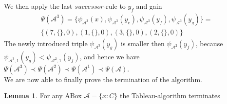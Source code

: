\documentclass{book}
\theoremstyle{break}
\theoremstyle{definition}
\newtheorem{mylem}{Lemma}
\begin{document}
We then apply the last $successor$-rule to $y_f$ and gain
\begin{align}
\Psi(\mathcal{A}^3)=\{\psi_{\mathcal{A}^3}(x),\psi_{\mathcal{A}^3}(y_e), \psi_{\mathcal{A}^3}(y_f),\psi_{\mathcal{A}^3}(y_g)\}=\nonumber\\
\{(7,\{\},0),(1,\{\},0),(3,\{\},0),(2,\{\},0)\}
\end{align}
The newly introduced triple $\psi_{\mathcal{A}^3}(y_g)$ is smaller then $\psi_{\mathcal{A}^2}(y_f)$, because $\psi_{\mathcal{A}^3,1}(y_g)<\psi_{\mathcal{A}^2,1}(y_f)$, and hence we have $\Psi(\mathcal{A}^3)\prec \Psi(\mathcal{A}^2)\prec\Psi(\mathcal{A}^1)\prec\Psi(\mathcal{A})$.\\
We are now able to finally prove the termination of the algorithm.
\begin{mylem}
For any ABox $\mathcal{A}=\{x:C\}$ the Tableau-algorithm terminates
\end{mylem}
\end{document}
